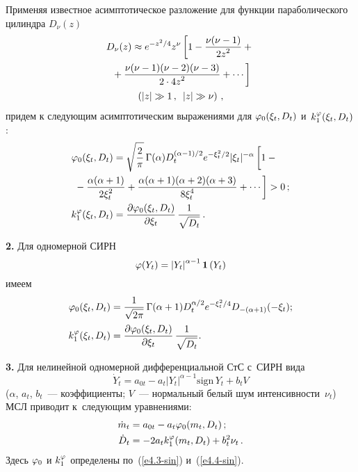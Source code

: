 \begin{multicols}{2}
Применяя известное асимптотическое разложение для
функции параболического цилиндра  $D_\nu(z)$~\cite{9-sin, 8-sin}
\begin{multline*}
D_\nu (z) \approx e^{-z^2/4} z^\nu \left[
1- \displaystyle\frac{\displaystyle \nu(\nu-1)\mathstrut}{\displaystyle 2z^2\mathstrut} +{}\right.\\
\left.{}+ \displaystyle\frac{\displaystyle \nu(\nu-1) (\nu-2) (\nu-3)\mathstrut}{\displaystyle 2\cdot 4 z^2\mathstrut} +\cdots\right]
\\
\left( |z|\gg1\,, \enskip |z|\gg\nu\right)\,,
\label{e4.7-sin}
\end{multline*}
придем к следующим асимптотическим выражениями для
$\varphi_0 (\xi_t, D_t)$ и~$k_1^\varphi (\xi_t, D_t)$:
  \begin{align*}
  \vrp_0 (\xi_t, D_t) &= \sqrt{\fr{2}{\pi}}\, \Gamma(\alpha)
  D_t^{(\alp-1)/2} e^{-\xi_t^2/2} |\xi_t|^{-\alpha}\left[
  \vphantom{\fr{\alpha(\alpha+1)(\alpha+2)(\alpha+3)}{8\xi_t^4}}
  1-{}\right.\notag\\
&\hspace*{-15mm}\left.{}- \fr{\alpha(\alpha+1)}{2\xi_t^2}+
\fr{\alpha(\alpha+1)(\alpha+2)(\alpha+3)}{8\xi_t^4}+\cdots\right]>0\,; \\ %
k_1^\vrp (\xi_t, D_t) &= \fr{\prt \vrp_0 (\xi_t, D_t)}{\prt \xi_t}\,
\fr{1}{\sqrt{D_t}}\,. %
\end{align*}

\textbf{2.}
Для одномерной СИРН
   \begin{equation}
   \varphi (Y_t) =\left\vert Y_t\right\vert^{\alpha-1} \mathbf{1}\, (Y_t)\label{e4.10-sin}
   \end{equation}
имеем
      \begin{align*}
   \vrp_0 (\xi_t, D_t) &= \fr{1}{\sqrt{2\pi}}\, \Gamma (\alpha+1) D_t^{\alpha/2}
   e^{-\xi_t^2/4} D_{-(\alpha+1)} (-\xi_t);\\ %
k_1^\vrp (\xi_t, D_t) &=\fr{\prt \vrp_0 (\xi_t, D_t)}{\prt \xi_t}\,
\fr{1}{\sqrt{D_t}}. %
\end{align*}

\textbf{3.}
Для нелинейной одномерной дифференциальной СтС с~СИРН вида
\begin{equation}
\dot Y_t = a_{0t} - a_t |Y_t|^{\alpha-1} \mathrm{sign}\, Y_t + b_t V
    \label{e4.13-sin}
    \end{equation}
($\alpha$, $a_t$, $b_t$~--- коэффициенты;
$V$~--- нормальный белый шум интенсивности~$\nu_t$) МСЛ приводит
к~сле\-ду\-ющим уравнениями:
\begin{align*}
\dot m_t &= a_{0t} - a_t \vrp_0 (m_t, D_t)\,;\\ %
\dot D_t &= -2a_t k_1^\vrp (m_t, D_t) + b_t^2 \nu_t\,. %
\end{align*}
Здесь $\varphi_0$ и $k_1^\varphi$ определены по~(\ref{e4.3-sin}) и~(\ref{e4.4-sin}).


\end{multicols}
